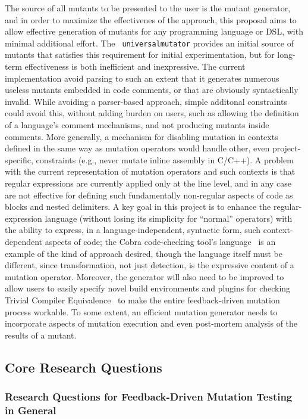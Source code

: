The source of all mutants to be presented to the user is the mutant
generator, and in order to maximize the effectivenes of the approach,
this proposal aims to allow effective generation of mutants for any
programming 
language or DSL, with minimal additional effort.  The {\tt
  universalmutator} provides an initial source of mutants that
satisfies this requirement for initial experimentation, but for
long-term effectiveness is both inefficient and inexpressive.  The
current implementation avoid parsing to such an extent that it
generates numerous useless mutants embedded in code comments, or that
are obviously syntactically invalid.  While avoiding a parser-based
approach, simple additonal constraints could avoid this, without
adding burden on users, such as allowing the definition of a
language's comment mechanisms, and not producing mutants inside
comments.  More generally, a mechanism for disabling mutation in
contexts defined in the same way as mutation operators would handle
other, even project-specific, constraints (e.g., never mutate inline
assembly in C/C++).  A problem with the current representation of
mutation operators and such contexts is that regular expressions are
currently applied only at the line level, and in any case are not
effective for defining such fundamentally non-regular aspects of code
as blocks and nested delimiters.  A key goal in this project is to
enhance the regular-expression language (without losing its simplicity
for ``normal'' operators) with the ability to express, in a
language-independent, syntactic form, such context-dependent aspects
of code; the Cobra code-checking tool's language~\cite{Cobra} is an
example of the kind of approach desired, though the language itself
must be different, since transformation,
not just detection, is the expressive content of a mutation operator.
Moreover, the generator will also need to be improved to allow users
to easily specify novel build environments and plugins for checking
Trivial Compiler Equivalence~\cite{TCE} to make the entire feedback-driven
mutation process workable.  To some extent, an efficient mutation
generator needs to incorporate aspects of mutation execution and even
post-mortem analysis of the results of a mutant.

\subsection{Core Research Questions}

\subsubsection{Research Questions for Feedback-Driven Mutation Testing
in General}

